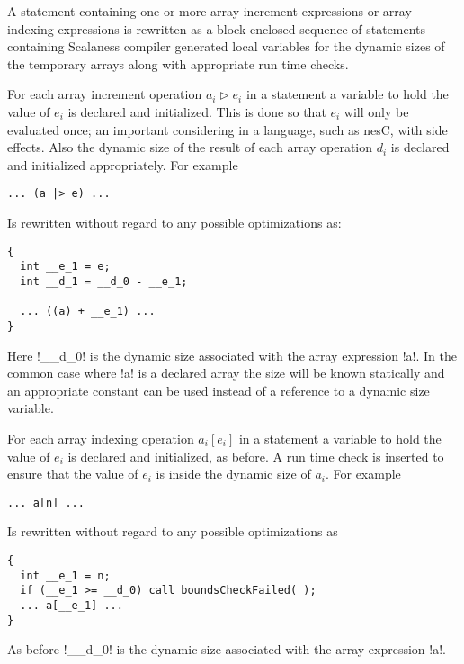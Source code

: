 A statement containing one or more array increment expressions or array indexing expressions is
rewritten as a block enclosed sequence of statements containing Scalaness compiler generated
local variables for the dynamic sizes of the temporary arrays along with appropriate run time
checks.

For each array increment operation $a_i \rhd e_i$ in a statement a variable to hold the value of
$e_i$ is declared and initialized. This is done so that $e_i$ will only be evaluated once; an
important considering in a language, such as nesC, with side effects. Also the dynamic size of
the result of each array operation $d_i$ is declared and initialized appropriately. For example

\singlespace
\begin{lstlisting}[language=nesC]
... (a |> e) ...
\end{lstlisting}
\primaryspacing

Is rewritten without regard to any possible optimizations as:

\singlespace
\begin{lstlisting}[language=nesC]
{
  int __e_1 = e;
  int __d_1 = __d_0 - __e_1;

  ... ((a) + __e_1) ...
}
\end{lstlisting}
\primaryspacing

Here !__d_0! is the dynamic size associated with the array expression !a!. In the common case
where !a! is a declared array the size will be known statically and an appropriate constant can
be used instead of a reference to a dynamic size variable.

For each array indexing operation $a_i[e_i]$ in a statement a variable to hold the value of
$e_i$ is declared and initialized, as before. A run time check is inserted to ensure that the
value of $e_i$ is inside the dynamic size of $a_i$. For example

\singlespace
\begin{lstlisting}[language=nesC]
... a[n] ...
\end{lstlisting}
\primaryspacing

Is rewritten without regard to any possible optimizations as

\singlespace
\begin{lstlisting}[language=nesC]
{
  int __e_1 = n;
  if (__e_1 >= __d_0) call boundsCheckFailed( );
  ... a[__e_1] ...
}
\end{lstlisting}
\primaryspacing

As before !__d_0! is the dynamic size associated with the array expression !a!.

